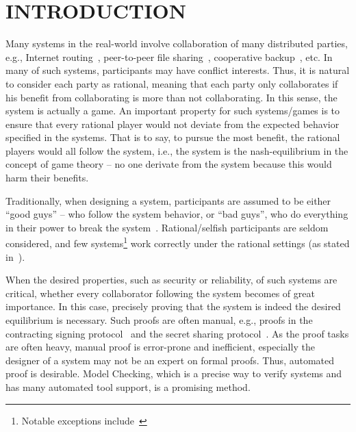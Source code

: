 \section{INTRODUCTION}%

Many systems in the real-world involve collaboration of many distributed parties, e.g., Internet routing~\cite{SP04}, peer-to-peer file sharing~\cite{BCK10}, cooperative backup~\cite{LEB03}, etc. 
In many of such systems, participants may have conflict interests. Thus, it is natural to consider each party as rational, meaning that each party only collaborates if his benefit from collaborating is more than not collaborating. In this sense, the system is actually a game. 
An important property for such systems/games is to ensure that every rational player would not deviate from the expected behavior specified in the systems. That is to say, to pursue the most benefit, the rational players would all follow the system, i.e., the system is the nash-equilibrium in the concept of game theory -- no one derivate from the system because this would harm their benefits.

Traditionally, when designing a system, participants are assumed to be either ``good guys'' -- who follow  the system behavior, or ``bad guys'', who do everything in their power to break the system~\cite{AAH11}. Rational/selfish participants are seldom considered, and few systems\footnote{Notable exceptions include~\cite{AAH11,LCW06}} work correctly under the rational settings (as stated in~\cite{MMS08}). 

When the desired properties, such as security or reliability, of such systems are critical, whether every collaborator following the system becomes of great importance. In this case, precisely proving that the system is indeed the desired equilibrium is necessary. Such proofs are often manual, e.g., proofs in the contracting signing protocol~\cite{Rabin83} and the secret sharing protocol~\cite{HT04}. As the proof tasks are often heavy, manual proof is error-prone and inefficient, especially the designer of a system may not be an expert on formal proofs. Thus, automated proof is desirable. Model Checking\cite{BK08}, which is a precise way to verify systems and has many automated tool support, is a promising method.


